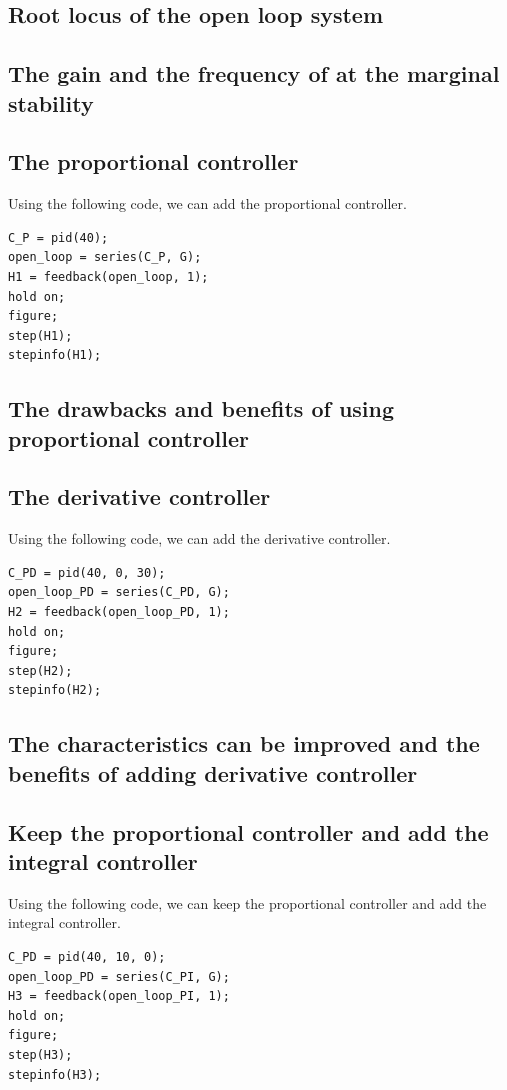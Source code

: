 \documentclass[a4paper, titlepage, twocolumn, 10pt]{article}
\begin{document}
	\subsection{Root locus of the open loop system}
	
	\subsection{The gain and the frequency of at the marginal stability}
	
	\subsection{The proportional controller}
	Using the following code, we can add the proportional controller.
	\begin{lstlisting}[frame=single]
C_P = pid(40);
open_loop = series(C_P, G);
H1 = feedback(open_loop, 1);
hold on;
figure;
step(H1);
stepinfo(H1);
	\end{lstlisting}
	\subsection{The drawbacks and benefits of using proportional controller}
	
	\subsection{The derivative controller}
	Using the following code, we can add the derivative controller.
	\begin{lstlisting}[frame=single]
C_PD = pid(40, 0, 30);
open_loop_PD = series(C_PD, G);
H2 = feedback(open_loop_PD, 1);
hold on;
figure;
step(H2);
stepinfo(H2);
	\end{lstlisting}
	\subsection{The characteristics can be improved and the benefits of adding derivative controller}
	
	\subsection{Keep the proportional controller and add the integral controller}
	Using the following code, we can keep the proportional controller and add the integral controller.
\begin{lstlisting}[frame=single]
C_PD = pid(40, 10, 0);
open_loop_PD = series(C_PI, G);
H3 = feedback(open_loop_PI, 1);
hold on;
figure;
step(H3);
stepinfo(H3);
\end{lstlisting}	
\end{document}
